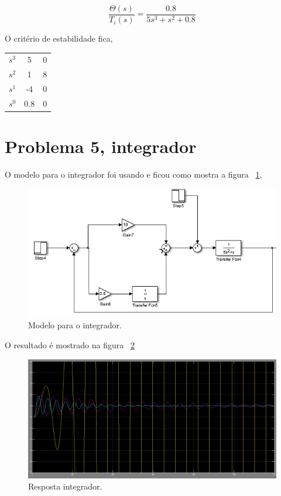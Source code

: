 \documentclass[a4paper, 10pt]{article}
\begin{document}
\begin{equation}
\frac{\Theta(s)}{T_i(s)} = \frac{0.8}{5 s^3 + s^2 + 0.8}
\end{equation}

O critério de estabilidade fica,

\begin{center}
    \begin{tabular}{c| c c}
        $s^3$ & 5 & 0 \\
        $s^2$ & 1 & 8 \\
        $s^1$ & -4 & 0 \\
        $s^0$ & 0.8 & 0 \\
    \end{tabular}
\end{center}

\section{Problema 5, integrador}

O modelo para o integrador foi usando e ficou como mostra a figura ~\ref{fig:modint},

\begin{figure}[!ht]
	\centering
	\includegraphics[scale=.5]{mqq5.png}
    \caption{Modelo para o integrador.}
    \label{fig:modint}
\end{figure}

O resultado é mostrado na figura ~\ref{fig:resint}

\begin{figure}[!ht]
	\centering
	\includegraphics[scale=.3]{rqq5.png}
    \caption{Resposta integrador.}
    \label{fig:resint}
\end{figure}
\end{document}
